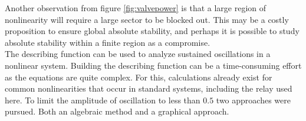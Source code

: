 \documentclass[a4paper, titlepage]{article}
\begin{document}
Another observation from figure \ref{fig:valvepower} is that a large region of nonlinearity will require a large sector to be blocked out.  This may be a costly proposition to ensure global absolute stability, and perhaps it is possible to study absolute stability within a finite region as a compromise.
\\

%
%
%
%
%
%

The describing function can be used to analyze sustained oscillations in a nonlinear system.
Building the describing function can be a time-consuming effort as the equations are quite complex.
For this, calculations already exist for common nonlinearities that occur in standard systems, including the relay used here.
To limit the amplitude of oscillation to less than $0.5$ two approaches were pursued.  
Both an algebraic method and a graphical approach.
\end{document}
